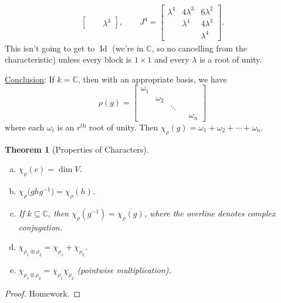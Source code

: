 \documentclass[12pt]{article}
\newcommand{\cx}{\mathbb{C}}
\newcommand\inv[1]{#1^{-1}}
\newtheorem{theorem}{Theorem}[section]
\theoremstyle{definition}
\DeclareMathOperator\Id{Id}
\begin{document}
\begin{enumerate}
\begin{equation}
\begin{split}
\begin{bmatrix}
             & & \lambda^3
        \end{bmatrix}
        ,
        \qquad
        J^4 =
        \begin{bmatrix}
            \lambda^4 & 4\lambda^3 & 6\lambda^2 \\
             & \lambda^4 & 4\lambda^3 \\
             & & \lambda^4
        \end{bmatrix}.
        \end{split}
    \end{equation}
    This isn't going to get to $\Id$ (we're in $\cx$, so no cancelling from the characteristic) unless every block is $1 \times 1$ and every $\lambda$ is a root of unity.
\end{enumerate}
\noindent \underline{Conclusion}: If $k = \cx$, then with an appropriate basis, we have 
\begin{equation}
    \rho(g) = 
    \begin{bmatrix}
        \omega_1 & & \\
         & \omega_2 & \\
         & & \ddots & \\
         & & & & \omega_n
    \end{bmatrix}
\end{equation}
where each $\omega_i$ is an $r^{\mathrm{th}}$ root of unity. Then $\chi_{\rho}(g) = \omega_1 + \omega_2 + \dotsb + \omega_n$.
\begin{theorem}[Properties of Characters]
    \noindent
    \begin{enumerate}[a)]
        \item $\chi_{\rho}(e) = \dim V$.
        \item $\chi_{\rho} \big( g h \inv{g} \big) = \chi_{\rho} (h)$.
        \item If $k \subseteq \cx$, then $\chi_{\rho} \left( \inv{g} \right) = \overline{\chi_{\rho} (g)}$, where the overline denotes complex conjugation.
        \item $\chi_{\rho_1 \oplus \rho_2} = \chi_{\rho_1} + \chi_{\rho_2}$.
        \item $\chi_{\rho_1 \otimes \rho_2} = \chi_{\rho_1} \chi_{\rho_2}$ (pointwise multiplication).
    \end{enumerate}
\end{theorem}
\begin{proof}
    Homework.
\end{proof}
\end{document}
